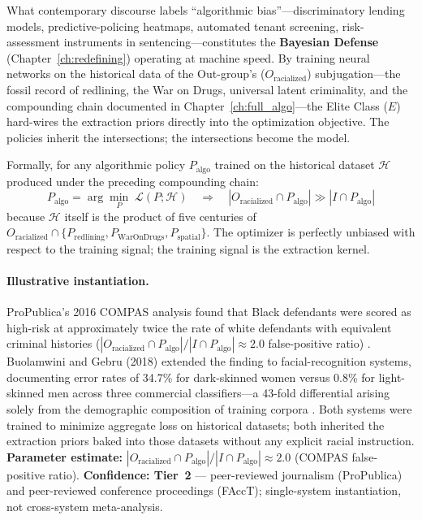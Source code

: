 What contemporary discourse labels ``algorithmic bias''---discriminatory lending models, predictive-policing heatmaps, automated tenant screening, risk-assessment instruments in sentencing---constitutes the \textbf{Bayesian Defense} (Chapter~\ref{ch:redefining}) operating at machine speed. By training neural networks on the historical data of the Out-group's ($O_{\text{racialized}}$) subjugation---the fossil record of redlining, the War on Drugs, universal latent criminality, and the compounding chain documented in Chapter~\ref{ch:full_algo}---the Elite Class ($E$) hard-wires the extraction priors directly into the optimization objective. The policies inherit the intersections; the intersections become the model.

Formally, for any algorithmic policy $P_{\text{algo}}$ trained on the historical dataset $\mathcal{H}$ produced under the preceding compounding chain:
\begin{equation}\label{eq:14.1-algo-prior-inheritance}
P_{\text{algo}} = \arg\min_{P} \; \mathcal{L}(P; \mathcal{H}) \quad \Longrightarrow \quad |O_{\text{racialized}} \cap P_{\text{algo}}| \gg |I \cap P_{\text{algo}}|
\end{equation}
because $\mathcal{H}$ itself is the product of five centuries of $O_{\text{racialized}} \cap \{P_{\text{redlining}}, P_{\text{WarOnDrugs}}, P_{\text{spatial}}\}$. The optimizer is perfectly unbiased with respect to the training signal; the training signal is the extraction kernel.

\paragraph{Illustrative instantiation.}
ProPublica's 2016 COMPAS analysis found that Black defendants were scored as high-risk at approximately twice the rate of white defendants with equivalent criminal histories ($|O_{\text{racialized}} \cap P_{\text{algo}}| / |I \cap P_{\text{algo}}| \approx 2.0$ false-positive ratio) \cite{angwin_machine_bias}. Buolamwini and Gebru (2018) extended the finding to facial-recognition systems, documenting error rates of 34.7\% for dark-skinned women versus 0.8\% for light-skinned men across three commercial classifiers---a 43-fold differential arising solely from the demographic composition of training corpora \cite{buolamwini_gender_shades}. Both systems were trained to minimize aggregate loss on historical datasets; both inherited the extraction priors baked into those datasets without any explicit racial instruction. \textbf{Parameter estimate:} $|O_{\text{racialized}} \cap P_{\text{algo}}| / |I \cap P_{\text{algo}}| \approx 2.0$ (COMPAS false-positive ratio). \textbf{Confidence: Tier~2} --- peer-reviewed journalism (ProPublica) and peer-reviewed conference proceedings (FAccT); single-system instantiation, not cross-system meta-analysis.

